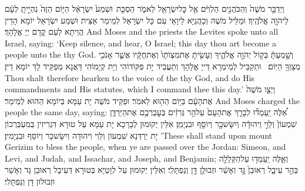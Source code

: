 {וַיְדַבֵּ֤ר מֹשֶׁה֙ וְהַכֹּהֲנִ֣ים הַלְוִיִּ֔ם אֶ֥ל כׇּל\maqqaf יִשְׂרָאֵ֖ל לֵאמֹ֑ר הַסְכֵּ֤ת \pasek  וּשְׁמַע֙ יִשְׂרָאֵ֔ל הַיּ֤וֹם הַזֶּה֙ נִהְיֵ֣יתָֽ לְעָ֔ם לַיהֹוָ֖ה אֱלֹהֶֽיךָ׃}
{וּמַלֵּיל מֹשֶׁה וְכָהֲנַיָּא לֵיוָאֵי עִם כָּל יִשְׂרָאֵל לְמֵימַר אַצֵּית וּשְׁמַע יִשְׂרָאֵל יוֹמָא הָדֵין הֲוֵיתָא לְעַם קֳדָם יְיָ אֱלָהָךְ׃}
{And Moses and the priests the Levites spoke unto all Israel, saying: ‘Keep silence, and hear, O Israel; this day thou art become a people unto the \lord\space thy God.}{}
{וְשָׁ֣מַעְתָּ֔ בְּק֖וֹל יְהֹוָ֣ה אֱלֹהֶ֑יךָ וְעָשִׂ֤יתָ אֶת\maqqaf מִצְוֺתָו֙ וְאֶת\maqqaf חֻקָּ֔יו אֲשֶׁ֛ר אָנֹכִ֥י מְצַוְּךָ֖ הַיּֽוֹם׃ \setuma }
{וּתְקַבֵּיל לְמֵימְרָא דַּייָ אֱלָהָךְ וְתַעֲבֵיד יָת פִּקּוֹדוֹהִי וְיָת קְיָמוֹהִי דַּאֲנָא מְפַקֵּיד לָךְ יוֹמָא דֵין׃}
{Thou shalt therefore hearken to the voice of the \lord\space thy God, and do His commandments and His statutes, which I command thee this day.’}{}
{וַיְצַ֤ו מֹשֶׁה֙ אֶת\maqqaf הָעָ֔ם בַּיּ֥וֹם הַה֖וּא לֵאמֹֽר׃}
{וּפַקֵּיד מֹשֶׁה יָת עַמָּא בְּיוֹמָא הַהוּא לְמֵימַר׃}
{And Moses charged the people the same day, saying:}{}
{אֵ֠לֶּה יַֽעַמְד֞וּ לְבָרֵ֤ךְ אֶת\maqqaf הָעָם֙ עַל\maqqaf הַ֣ר גְּרִזִ֔ים בְּעׇבְרְכֶ֖ם אֶת\maqqaf הַיַּרְדֵּ֑ן שִׁמְעוֹן֙ וְלֵוִ֣י וִֽיהוּדָ֔ה וְיִשָּׂשכָ֖ר וְיוֹסֵ֥ף וּבִנְיָמִֽן׃}
{אִלֵּין יְקוּמוּן לְבָרָכָא יָת עַמָּא עַל טוּרָא דִּגְרִיזִין בְּמִעְבַּרְכוֹן יָת יַרְדְּנָא שִׁמְעוֹן וְלֵוִי וִיהוּדָה וְיִשָּׂשכָר וְיוֹסֵף וּבִנְיָמִין׃}
{’These shall stand upon mount Gerizim to bless the people, when ye are passed over the Jordan: Simeon, and Levi, and Judah, and Issachar, and Joseph, and Benjamin;}{}
{וְאֵ֛לֶּה יַֽעַמְד֥וּ עַל\maqqaf הַקְּלָלָ֖ה בְּהַ֣ר עֵיבָ֑ל רְאוּבֵן֙ גָּ֣ד וְאָשֵׁ֔ר וּזְבוּלֻ֖ן דָּ֥ן וְנַפְתָּלִֽי׃}
{וְאִלֵּין יְקוּמוּן עַל לְוָטַיָּא בְּטוּרָא דְּעֵיבָל רְאוּבֵן גָּד וְאָשֵׁר וּזְבוּלוּן דָּן וְנַפְתָּלִי׃}
